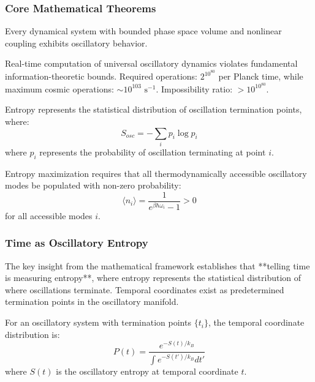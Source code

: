 ﻿\documentclass[11pt,a4paper]{article}
\begin{document}
\subsubsection{Core Mathematical Theorems}

\begin{theorem}
Every dynamical system with bounded phase space volume and nonlinear coupling exhibits oscillatory behavior.
\end{theorem}

\begin{theorem}
Real-time computation of universal oscillatory dynamics violates fundamental information-theoretic bounds. Required operations: $2^{10^{80}}$ per Planck time, while maximum cosmic operations: $\sim 10^{103} \text{ s}^{-1}$. Impossibility ratio: $>10^{10^{80}}$.
\end{theorem}

\begin{theorem}
Entropy represents the statistical distribution of oscillation termination points, where:
\begin{equation}
S_{osc} = -\sum_i p_i \log p_i
\end{equation}
where $p_i$ represents the probability of oscillation terminating at point $i$.
\end{theorem}

\begin{theorem}
Entropy maximization requires that all thermodynamically accessible oscillatory modes be populated with non-zero probability:
\begin{equation}
\langle n_i \rangle = \frac{1}{e^{\beta \hbar \omega_i} - 1} > 0
\end{equation}
for all accessible modes $i$.
\end{theorem}

\subsubsection{Time as Oscillatory Entropy}

The key insight from the mathematical framework establishes that **telling time is measuring entropy**, where entropy represents the statistical distribution of where oscillations terminate. Temporal coordinates exist as predetermined termination points in the oscillatory manifold.

\begin{definition}
For an oscillatory system with termination points $\{t_i\}$, the temporal coordinate distribution is:
\begin{equation}
P(t) = \frac{e^{-S(t)/k_B}}{\int e^{-S(t')/k_B} dt'}
\end{equation}
where $S(t)$ is the oscillatory entropy at temporal coordinate $t$.
\end{definition}
\end{document}
